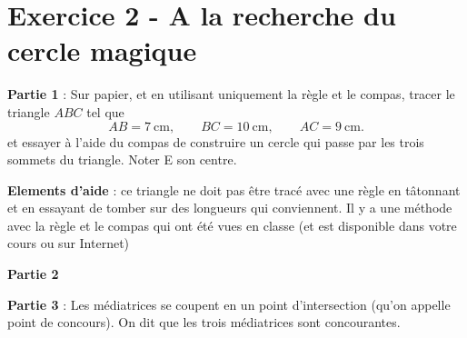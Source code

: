 \documentclass[answers]{exam}
\begin{document}
\section*{Exercice 2 - A la recherche du cercle magique}

\begin{questions}

\question \textbf{Partie 1} : Sur papier, et en utilisant uniquement la règle et le compas, tracer le triangle $ABC$ tel que 
 \[
  AB = 7~\text{cm}, \qquad BC = 10~\text{cm}, \qquad AC = 9~\text{cm}.
  \]
et essayer à l'aide du compas de construire un cercle qui passe par les trois sommets du triangle. Noter E son centre.

\begin{Indication}
  \textbf{Elements d'aide} : ce triangle ne doit pas être tracé avec une règle en tâtonnant et en essayant de tomber sur des longueurs qui conviennent. Il y a une méthode avec la règle et le compas qui ont été vues en classe (et est disponible dans votre cours ou sur Internet)
\end{Indication}

\question \textbf{Partie 2}

\question \textbf{Partie 3} : Les médiatrices se coupent en un point d'intersection (qu'on appelle point de concours).  
On dit que les trois médiatrices sont concourantes.
\end{questions}
\end{document}
